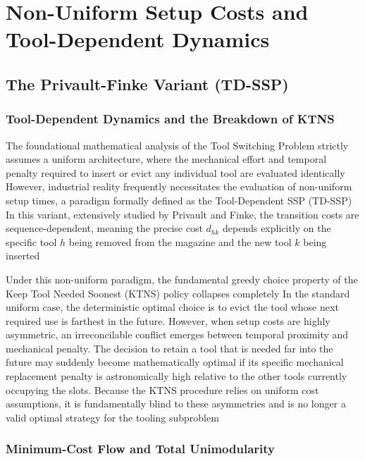 \documentclass[11pt, a4paper]{book}
\begin{document}
	\chapter{Non-Uniform Setup Costs and Tool-Dependent Dynamics}
	
	\section{The Privault-Finke Variant (TD-SSP)}
	
	\subsection{Tool-Dependent Dynamics and the Breakdown of KTNS}
	
	The foundational mathematical analysis of the Tool Switching Problem strictly assumes a uniform architecture, where the mechanical effort and temporal penalty required to insert or evict any individual tool are evaluated identically %
	However, industrial reality frequently necessitates the evaluation of non-uniform setup times, a paradigm formally defined as the Tool-Dependent SSP (TD-SSP) %
	In this variant, extensively studied by Privault and Finke, the transition costs are sequence-dependent, meaning the precise cost $d_{hk}$ depends explicitly on the specific tool $h$ being removed from the magazine and the new tool $k$ being inserted %
	
	Under this non-uniform paradigm, the fundamental greedy choice property of the Keep Tool Needed Soonest (KTNS) policy collapses completely %
	In the standard uniform case, the deterministic optimal choice is to evict the tool whose next required use is farthest in the future.
	However, when setup costs are highly asymmetric, an irreconcilable conflict emerges between temporal proximity and mechanical penalty.
	The decision to retain a tool that is needed far into the future may suddenly become mathematically optimal if its specific mechanical replacement penalty is astronomically high relative to the other tools currently occupying the slots.
	Because the KTNS procedure relies on uniform cost assumptions, it is fundamentally blind to these asymmetries and is no longer a valid optimal strategy for the tooling subproblem %
	
	\subsection{Minimum-Cost Flow and Total Unimodularity}
	
\end{document}
